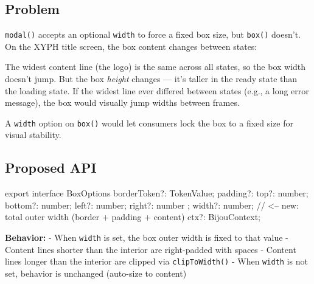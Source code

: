 \subsection{Problem}\label{record-016-problem-1}

\texttt{m\allowbreak{}o\allowbreak{}d\allowbreak{}a\allowbreak{}l\allowbreak{}(\allowbreak{})} accepts an optional \texttt{w\allowbreak{}i\allowbreak{}d\allowbreak{}t\allowbreak{}h} to force a fixed box size, but \texttt{b\allowbreak{}o\allowbreak{}x\allowbreak{}(\allowbreak{})} doesn't. On the XYPH title screen, the box content changes between states:



The widest content line (the logo) is the same across all states, so the box width doesn't jump. But the box \emph{height} changes --- it's taller in the ready state than the loading state. If the widest line ever differed between states (e.g., a long error message), the box would visually jump widths between frames.

A \texttt{w\allowbreak{}i\allowbreak{}d\allowbreak{}t\allowbreak{}h} option on \texttt{b\allowbreak{}o\allowbreak{}x\allowbreak{}(\allowbreak{})} would let consumers lock the box to a fixed size for visual stability.

\subsection{Proposed API}\label{record-016-proposed-api-1}

\begin{CodeBlock}
export interface BoxOptions {
  borderToken?: TokenValue;
  padding?: { top?: number; bottom?: number; left?: number; right?: number };
  width?: number;  // <-- new: total outer width (border + padding + content)
  ctx?: BijouContext;
}
\end{CodeBlock}

\textbf{Behavior:} - When \texttt{w\allowbreak{}i\allowbreak{}d\allowbreak{}t\allowbreak{}h} is set, the box outer width is fixed to that value - Content lines shorter than the interior are right-padded with spaces - Content lines longer than the interior are clipped via \texttt{c\allowbreak{}l\allowbreak{}i\allowbreak{}p\allowbreak{}T\allowbreak{}o\allowbreak{}W\allowbreak{}i\allowbreak{}d\allowbreak{}t\allowbreak{}h\allowbreak{}(\allowbreak{})} - When \texttt{w\allowbreak{}i\allowbreak{}d\allowbreak{}t\allowbreak{}h} is not set, behavior is unchanged (auto-size to content)


